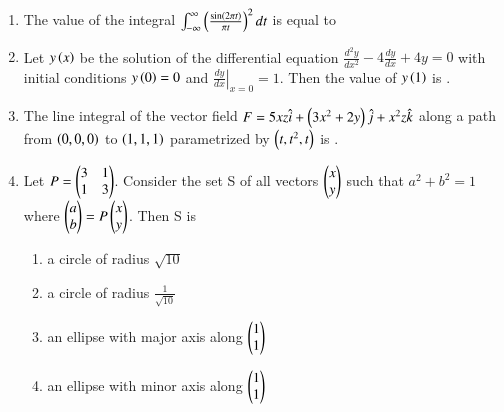 \documentclass[journal,12pt,onecolumn]{IEEEtran}
\theoremstyle{remark}
\begin{document}
\begin{enumerate}[start=1, label=Q.\arabic*]
    \hfill{}

    \item The value of the integral $\int_{-\infty}^{\infty} \left(\frac{\sin\left(2\pi t\right)}{\pi t}\right)^2 dt$ is equal to
    \begin{enumerate}
    \end{enumerate}

    \hfill{}

    \item Let $y\left(x\right)$ be the solution of the differential equation $\frac{d^2y}{dx^2} - 4\frac{dy}{dx} + 4y = 0$ with initial conditions $y\left(0\right)=0$ and $\left. \frac{dy}{dx} \right|_{x=0} = 1$. Then the value of $y\left(1\right)$ is \underline{\hspace{2cm}}.

    \hfill{}

    \item The line integral of the vector field $F = 5xz\hat{i} + \left(3x^2 + 2y\right)\hat{j} + x^2z\hat{k}$ along a path from $\left(0,0,0\right)$ to $\left(1,1,1\right)$ parametrized by $\left(t, t^2, t\right)$ is \underline{\hspace{2cm}}.

    \hfill{}

    \item Let $P = \begin{pmatrix}3 & 1 \\ 1 & 3\end{pmatrix}$. Consider the set S of all vectors $\begin{pmatrix}x \\ y\end{pmatrix}$ such that $a^2+b^2=1$ where $\begin{pmatrix}a \\ b\end{pmatrix} = P\begin{pmatrix}x \\ y\end{pmatrix}$. Then S is
    \begin{enumerate}
        \item a circle of radius $\sqrt{10}$
        \item a circle of radius $\frac{1}{\sqrt{10}}$
        \item an ellipse with major axis along $\begin{pmatrix}1 \\ 1\end{pmatrix}$
        \item an ellipse with minor axis along $\begin{pmatrix}1 \\ 1\end{pmatrix}$
    \end{enumerate}


\end{enumerate}
\end{document}
